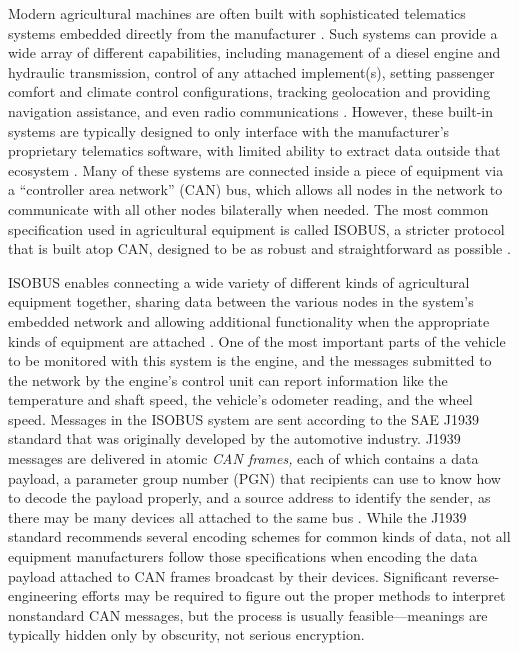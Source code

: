 \documentclass[
]{article}
\begin{document}
Modern agricultural machines are often built with sophisticated
telematics systems embedded directly from the manufacturer
\parencite{Krzyzaniak_UseTelematicsSystems_2022}. Such systems can
provide a wide array of different capabilities, including management of
a diesel engine and hydraulic transmission, control of any attached
implement(s), setting passenger comfort and climate control
configurations, tracking geolocation and providing navigation
assistance, and even radio communications
\parencite{Goltyapin_GlobalTrendsDevelopment_2020}. However, these
built-in systems are typically designed to only interface with the
manufacturer's proprietary telematics software, with limited ability to
extract data outside that ecosystem
\parencite{Thomasson_ReviewStateArt_2018}. Many of these systems are
connected inside a piece of equipment via a ``controller area network''
(CAN) bus, which allows all nodes in the network to communicate with all
other nodes bilaterally when needed. The most common specification used
in agricultural equipment is called ISOBUS, a stricter protocol that is
built atop CAN, designed to be as robust and straightforward as possible
\parencite{Brodie_BuzzwordIsobus_2023}.

ISOBUS enables connecting a wide variety of different kinds of
agricultural equipment together, sharing data between the various nodes
in the system's embedded network and allowing additional functionality
when the appropriate kinds of equipment are attached
\parencite{Brodie_BuzzwordIsobus_2023}. One of the most important parts
of the vehicle to be monitored with this system is the engine, and the
messages submitted to the network by the engine's control unit can
report information like the temperature and shaft speed, the vehicle's
odometer reading, and the wheel speed. Messages in the ISOBUS system are
sent according to the SAE J1939 standard that was originally developed
by the automotive industry. J1939 messages are delivered in atomic
\emph{CAN frames,} each of which contains a data payload, a parameter
group number (PGN) that recipients can use to know how to decode the
payload properly, and a source address to identify the sender, as there
may be many devices all attached to the same bus
\parencite{Pietikaeinen_RemoteIsobusTelematics_2014}. While the J1939
standard recommends several encoding schemes for common kinds of data,
not all equipment manufacturers follow those specifications when
encoding the data payload attached to CAN frames broadcast by their
devices. Significant reverse-engineering efforts may be required to
figure out the proper methods to interpret nonstandard CAN messages, but
the process is usually feasible---meanings are typically hidden only by
obscurity, not serious encryption.
\end{document}
